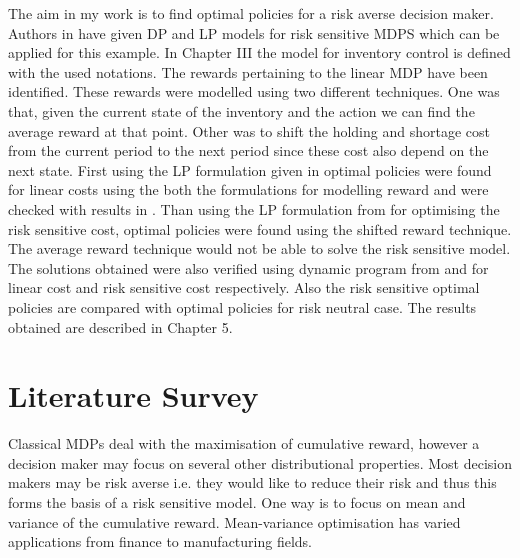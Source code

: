 \documentclass[11pt,a4paper,oneside]{report}
\begin{document}
\noindent The aim in my work is to find optimal policies for a risk averse decision maker. Authors in \citep{kumar2015finite} have given DP and LP models for risk sensitive MDPS which can be applied for this example. In Chapter III the model for inventory control is defined with the used notations. The rewards pertaining to the linear MDP have been identified. These rewards were modelled using two different techniques. One was that, given the current state of the inventory and the action we can find the average reward at that point. Other was to shift the holding and shortage cost from the current period to the next period since these cost also depend on the next state. First using the LP formulation given in \cite{puterman1990market} optimal policies were found for linear costs using the both the formulations for modelling reward and were checked with results in \citep{scarf1959optimality}. Than using the LP formulation from  \citep{kumar2015finite} for optimising the risk sensitive cost, optimal policies were found using the shifted reward technique. The average reward technique would not be able to solve the risk sensitive model. The solutions obtained were also verified using dynamic program from \citep{puterman1990market} and \citep{kumar2015finite} for linear cost and risk sensitive cost respectively. Also the risk sensitive optimal policies are compared with optimal policies for risk neutral case. The results obtained are described in Chapter 5.

\chapter{Literature Survey}

\noindent Classical MDPs deal with the maximisation of cumulative reward, however a decision maker may focus on several other distributional properties. Most decision makers may be risk averse i.e. they would like to reduce their risk and thus this forms the basis of a risk sensitive model. 
One way is to focus on mean and variance of the cumulative reward. Mean-variance optimisation has varied applications from finance to manufacturing fields.\\
\end{document}
